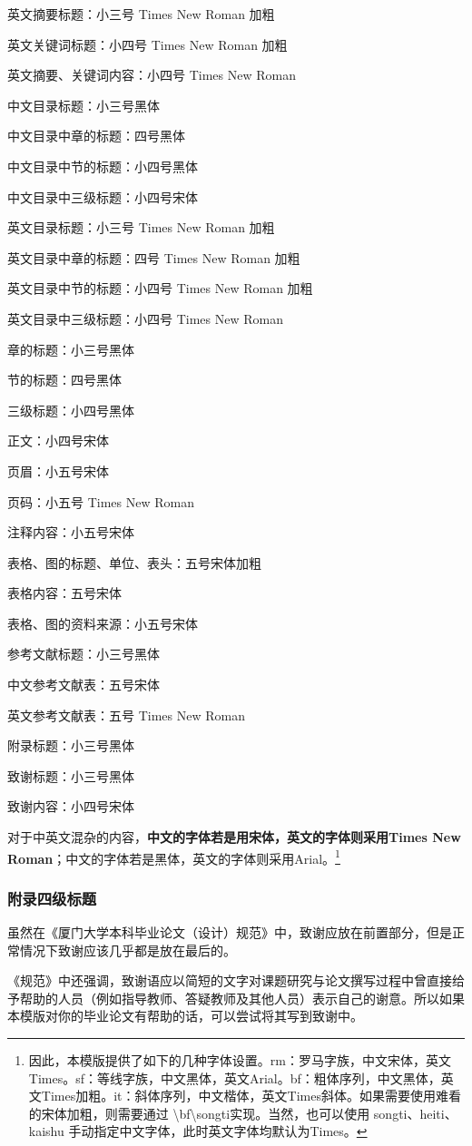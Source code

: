 \documentclass{xmu}
\begin{document}
\begin{appendix}
    英文摘要标题：小三号 Times New Roman 加粗\par
    英文关键词标题：小四号 Times New Roman 加粗\par
    英文摘要、关键词内容：小四号 Times New Roman\par
    中文目录标题：小三号黑体\par
    中文目录中章的标题：四号黑体\par
    中文目录中节的标题：小四号黑体\par
    中文目录中三级标题：小四号宋体\par
    英文目录标题：小三号 Times New Roman 加粗\par
    英文目录中章的标题：四号 Times New Roman 加粗\par
    英文目录中节的标题：小四号 Times New Roman 加粗\par
    英文目录中三级标题：小四号 Times New Roman\par
    章的标题：小三号黑体\par
    节的标题：四号黑体\par
    三级标题：小四号黑体\par
    正文：小四号宋体\par
    页眉：小五号宋体\par
    页码：小五号 Times New Roman\par
    注释内容：小五号宋体\par
    表格、图的标题、单位、表头：五号宋体加粗\par
    表格内容：五号宋体\par
    表格、图的资料来源：小五号宋体\par
    参考文献标题：小三号黑体\par
    中文参考文献表：五号宋体\par
    英文参考文献表：五号 Times New Roman\par
    附录标题：小三号黑体\par
    致谢标题：小三号黑体\par
    致谢内容：小四号宋体\par
    对于中英文混杂的内容，{\bf\songti 中文的字体若是用宋体，英文的字体则采用Times New Roman}；{\sf 中文的字体若是黑体，英文的字体则采用Arial}。\footnote{
        因此，本模版提供了如下的几种字体设置。rm：罗马字族，中文宋体，英文Times。sf：等线字族，中文黑体，英文Arial。bf：粗体序列，中文黑体，英文Times加粗。it：斜体序列，中文楷体，英文Times斜体。如果需要使用难看的宋体加粗，则需要通过 \textbackslash bf\textbackslash songti实现。当然，也可以使用 songti、heiti、kaishu 手动指定中文字体，此时英文字体均默认为Times。
    }
    \subsubsection{附录四级标题}
\end{appendix}


\begin{acknowledgement}
    虽然在《厦门大学本科毕业论文（设计）规范》中，致谢应放在前置部分，但是正常情况下致谢应该几乎都是放在最后的。
    \par
    《规范》中还强调，致谢语应以简短的文字对课题研究与论文撰写过程中曾直接给予帮助的人员（例如指导教师、答疑教师及其他人员）表示自己的谢意。所以如果本模版对你的毕业论文有帮助的话，可以尝试将其写到致谢中。
\end{acknowledgement}
\end{document}
